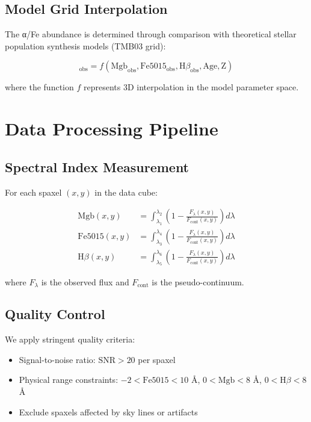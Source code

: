 \documentclass[11pt,a4paper]{article}
\begin{document}
\subsection{Model Grid Interpolation}

The α/Fe abundance is determined through comparison with theoretical stellar population synthesis models (TMB03 grid):

\begin{equation}
[\alpha/\text{Fe}]_\text{obs} = f(\text{Mgb}_\text{obs}, \text{Fe5015}_\text{obs}, \text{H}\beta_\text{obs}, \text{Age}, \text{Z})
\end{equation}

where the function $f$ represents 3D interpolation in the model parameter space.

\section{Data Processing Pipeline}

\subsection{Spectral Index Measurement}

For each spaxel $(x,y)$ in the data cube:

\begin{align}
\text{Mgb}(x,y) &= \int_{\lambda_1}^{\lambda_2} \left(1 - \frac{F_\lambda(x,y)}{F_{\text{cont}}(x,y)}\right) d\lambda \\
\text{Fe5015}(x,y) &= \int_{\lambda_3}^{\lambda_4} \left(1 - \frac{F_\lambda(x,y)}{F_{\text{cont}}(x,y)}\right) d\lambda \\
\text{H}\beta(x,y) &= \int_{\lambda_5}^{\lambda_6} \left(1 - \frac{F_\lambda(x,y)}{F_{\text{cont}}(x,y)}\right) d\lambda
\end{align}

where $F_\lambda$ is the observed flux and $F_{\text{cont}}$ is the pseudo-continuum.

\subsection{Quality Control}

We apply stringent quality criteria:
\begin{itemize}
\item Signal-to-noise ratio: $\text{SNR} > 20$ per spaxel
\item Physical range constraints: $-2 < \text{Fe5015} < 10$ Å, $0 < \text{Mgb} < 8$ Å, $0 < \text{H}\beta < 8$ Å
\item Exclude spaxels affected by sky lines or artifacts
\end{itemize}
\end{document}
